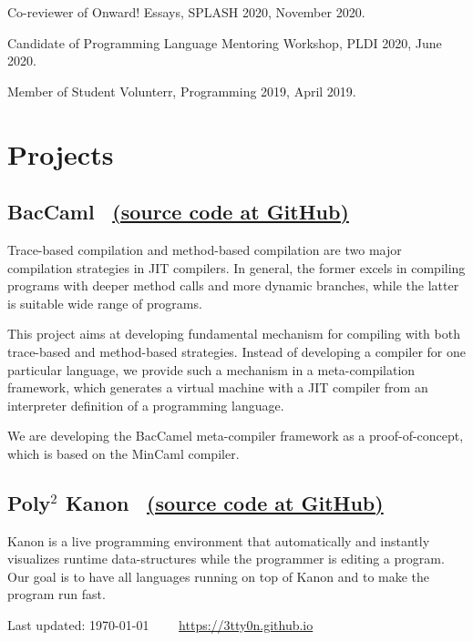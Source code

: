 \documentclass[11pt]{article} %
\newcommand{\伊澤侑祐}{\underline{伊澤侑祐}}
\newcommand{\jit}{\textsc{JIT} }
\begin{document}
 Co-reviewer of Onward! Essays, SPLASH 2020, November 2020.

 Candidate of Programming Language Mentoring Workshop, PLDI 2020, June 2020.

 Member of Student Volunterr, Programming 2019, April 2019.

\section*{Projects}

\subsection*{BacCaml \, \href{https://github.com/prg-titech/baccaml}{(source code at GitHub)}}

\medskip

Trace-based compilation and method-based compilation are two major compilation
strategies in \jit compilers. In general, the former excels in  compiling
programs with deeper method calls and more dynamic branches, while  the latter
is suitable wide range of programs.

\medskip

This project aims at developing fundamental mechanism for compiling with both
trace-based and method-based strategies. Instead of developing  a compiler for
one particular language, we provide such a mechanism in a meta-compilation
framework, which generates a virtual machine with a \jit compiler from an
interpreter definition of a programming language.

\medskip

We are developing the BacCamel meta-compiler framework as a proof-of-concept,
which is based on the MinCaml compiler.

\medskip

\subsection*{Poly$^2$ Kanon \,
  \href{https://github.com/prg-titech/Kanon}{(source code at GitHub)}}

Kanon is a live programming environment that automatically and instantly
visualizes runtime data-structures while the programmer is editing a
program. Our goal is to have all languages running on top of Kanon and to make
the program run fast.


\vfill %


\begin{center}
  \scriptsize
  Last updated: \today~~\raisebox{-0.5pt}{\textbullet}~~
  \href{https://3tty0n.github.io}{https://3tty0n.github.io}
\end{center}

\end{document}
